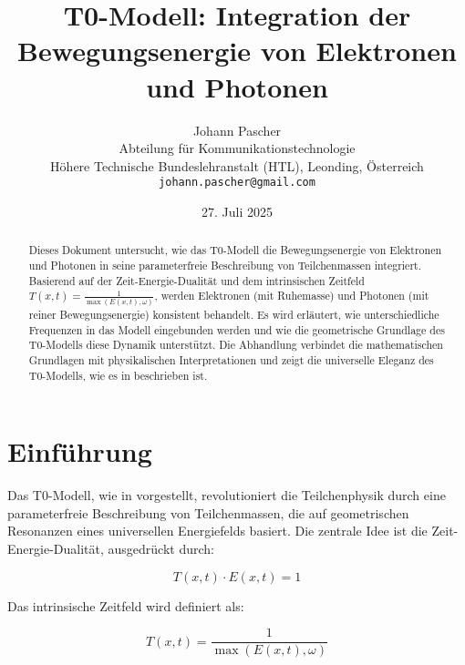 \documentclass[12pt,a4paper]{article}
\begin{document}
	
	\title{T0-Modell: Integration der Bewegungsenergie von Elektronen und Photonen}
	\author{Johann Pascher\\
		Abteilung für Kommunikationstechnologie\\
		Höhere Technische Bundeslehranstalt (HTL), Leonding, Österreich\\
		\texttt{johann.pascher@gmail.com}}
	\date{27. Juli 2025}
	
	\maketitle
	
	\begin{abstract}
		Dieses Dokument untersucht, wie das T0-Modell die Bewegungsenergie von Elektronen und Photonen in seine parameterfreie Beschreibung von Teilchenmassen integriert. Basierend auf der Zeit-Energie-Dualität und dem intrinsischen Zeitfeld \( T(x,t) = \frac{1}{\max(E(x,t), \omega)} \), werden Elektronen (mit Ruhemasse) und Photonen (mit reiner Bewegungsenergie) konsistent behandelt. Es wird erläutert, wie unterschiedliche Frequenzen in das Modell eingebunden werden und wie die geometrische Grundlage des T0-Modells diese Dynamik unterstützt. Die Abhandlung verbindet die mathematischen Grundlagen mit physikalischen Interpretationen und zeigt die universelle Eleganz des T0-Modells, wie es in \cite{pascher_t0_energie_2025} beschrieben ist.
	\end{abstract}
	
	\tableofcontents
	\newpage
	
	\section{Einführung}
	\label{sec:introduction}
	
	Das T0-Modell, wie in \cite{pascher_t0_energie_2025} vorgestellt, revolutioniert die Teilchenphysik durch eine parameterfreie Beschreibung von Teilchenmassen, die auf geometrischen Resonanzen eines universellen Energiefelds basiert. Die zentrale Idee ist die Zeit-Energie-Dualität, ausgedrückt durch:
	
	\begin{equation}
		T(x,t) \cdot E(x,t) = 1
		\label{eq:time_energy_duality}
	\end{equation}
	
	Das intrinsische Zeitfeld wird definiert als:
	
	\begin{equation}
		T(x,t) = \frac{1}{\max(E(x,t), \omega)}
		\label{eq:intrinsic_time_field}
	\end{equation}
	
\end{document}

